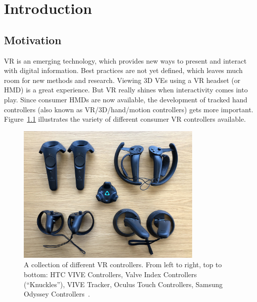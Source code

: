 \chapter{Introduction}\label{chapter:introduction}

\section{Motivation}\label{section:motivation}

\ac{VR} is an emerging technology, which provides new ways to present and interact with digital information. Best practices are not yet defined, which leaves much room for new methods and research. Viewing \ac{3D} \acp{VE} using a \ac{VR} headset (or \ac{HMD}) is a great experience. But \ac{VR} really shines when interactivity comes into play. Since consumer \acp{HMD} are now available, the development of tracked hand controllers (also known as \ac{VR}/\ac{3D}/hand/motion controllers) gets more important. Figure~\ref{fig:vr-controllers} illustrates the variety of different consumer \ac{VR} controllers available.

\begin{figure}[H]%
 \centering%
 \includegraphics[width=9cm]{figures/introduction/vr_controllers.jpg}%
 \caption[Collection of VR controllers]{A collection of different \ac{VR} controllers. From left to right, top to bottom: HTC VIVE Controllers, Valve Index Controllers (\enquote{Knuckles}), VIVE Tracker, Oculus Touch Controllers, Samsung Odyssey Controllers~\cite{Yang.2018}.}\label{fig:vr-controllers}
\end{figure}

